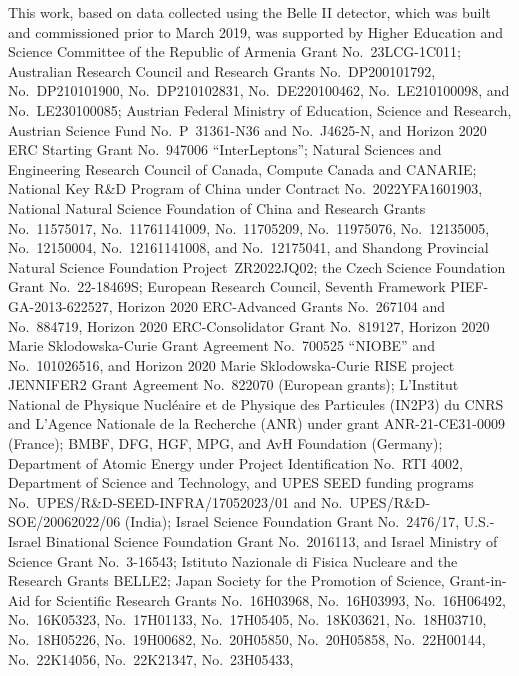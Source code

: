 This work, based on data collected using the Belle II detector, which was built and commissioned prior to March 2019, was supported by
Higher Education and Science Committee of the Republic of Armenia Grant No.~23LCG-1C011;
Australian Research Council and Research Grants
No.~DP200101792, %
No.~DP210101900, %
No.~DP210102831, %
No.~DE220100462, %
No.~LE210100098, %
and
No.~LE230100085; %
Austrian Federal Ministry of Education, Science and Research,
Austrian Science Fund
No.~P~31361-N36
and
No.~J4625-N,
and
Horizon 2020 ERC Starting Grant No.~947006 ``InterLeptons'';
Natural Sciences and Engineering Research Council of Canada, Compute Canada and CANARIE;
National Key R\&D Program of China under Contract No.~2022YFA1601903,
National Natural Science Foundation of China and Research Grants
No.~11575017,
No.~11761141009,
No.~11705209,
No.~11975076,
No.~12135005,
No.~12150004,
No.~12161141008,
and
No.~12175041,
and Shandong Provincial Natural Science Foundation Project~ZR2022JQ02;
the Czech Science Foundation Grant No.~22-18469S;
European Research Council, Seventh Framework PIEF-GA-2013-622527,
Horizon 2020 ERC-Advanced Grants No.~267104 and No.~884719,
Horizon 2020 ERC-Consolidator Grant No.~819127,
Horizon 2020 Marie Sklodowska-Curie Grant Agreement No.~700525 ``NIOBE''
and
No.~101026516,
and
Horizon 2020 Marie Sklodowska-Curie RISE project JENNIFER2 Grant Agreement No.~822070 (European grants);
L'Institut National de Physique Nucl\'{e}aire et de Physique des Particules (IN2P3) du CNRS
and
L'Agence Nationale de la Recherche (ANR) under grant ANR-21-CE31-0009 (France);
BMBF, DFG, HGF, MPG, and AvH Foundation (Germany);
Department of Atomic Energy under Project Identification No.~RTI 4002,
Department of Science and Technology,
and
UPES SEED funding programs
No.~UPES/R\&D-SEED-INFRA/17052023/01 and
No.~UPES/R\&D-SOE/20062022/06 (India);
Israel Science Foundation Grant No.~2476/17,
U.S.-Israel Binational Science Foundation Grant No.~2016113, and
Israel Ministry of Science Grant No.~3-16543;
Istituto Nazionale di Fisica Nucleare and the Research Grants BELLE2;
Japan Society for the Promotion of Science, Grant-in-Aid for Scientific Research Grants
No.~16H03968,
No.~16H03993,
No.~16H06492,
No.~16K05323,
No.~17H01133,
No.~17H05405,
No.~18K03621,
No.~18H03710,
No.~18H05226,
No.~19H00682, %
No.~20H05850,
No.~20H05858,
No.~22H00144,
No.~22K14056,
No.~22K21347,
No.~23H05433,

